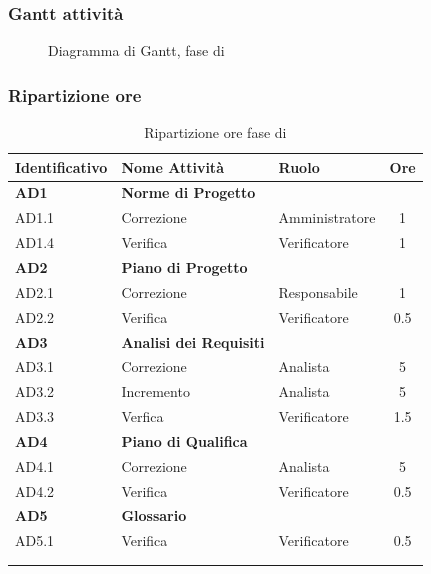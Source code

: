 \subsubsection{Gantt attività}
\begin{figure}[H]
	\centering
	\caption{Diagramma di Gantt, fase di \AD{}}
\end{figure}

\subsubsection{Ripartizione ore}
\bgroup
\begin{longtable}{|l|l|l|c|}
	\endfirsthead
	\hline
	\textbf{Identificativo} &
	\textbf{Nome Attività} &
	\textbf{Ruolo} &
	\textbf{Ore}\\
	\endhead
	\hline
	\textbf{AD1} & \textbf{Norme di Progetto} &  &  \\
		\hline
		{AD1.1} & {Correzione} & Amministratore  & 1\\
		\hline
		{AD1.4} & {Verifica} & Verificatore & 1 \\
		\hline
	\textbf{AD2} & \textbf{Piano di Progetto}  & & \\
	\hline
		{AD2.1} & {Correzione} & Responsabile &  1\\
		\hline
		{AD2.2} & {Verifica} & Verificatore & 0.5 \\
		\hline
	\textbf{AD3} & \textbf{Analisi dei Requisiti} & &  \\
		\hline
		{AD3.1} & {Correzione} & Analista  &  5\\
		\hline
		{AD3.2} & {Incremento} & Analista  &  5\\
		\hline
		{AD3.3} & {Verfica} & Verificatore  &  1.5\\
		\hline
	\textbf{AD4} & \textbf{Piano di Qualifica} & &  \\
	\hline
		{AD4.1} & {Correzione} & Analista &  5 \\
		\hline
		{AD4.2} & {Verifica} & Verificatore &  0.5 \\
		\hline
	\textbf{AD5} & \textbf{Glossario} & &  \\
	\hline
		{AD5.1} & {Verifica} & Verificatore &  0.5 \\
	\hline
	\\
	\caption{Ripartizione ore fase di \AD{}}
\end{longtable}
\egroup

